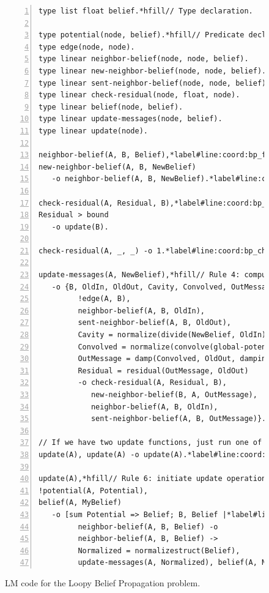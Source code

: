 \begin{figure}[ht]
\begin{Verbatim}[numbers=left, fontsize=\codesize, commandchars=\*\#\&]
type list float belief.*hfill// Type declaration.

type potential(node, belief).*hfill// Predicate declaration
type edge(node, node).
type linear neighbor-belief(node, node, belief).
type linear new-neighbor-belief(node, node, belief).
type linear sent-neighbor-belief(node, node, belief).
type linear check-residual(node, float, node).
type linear belief(node, belief).
type linear update-messages(node, belief).
type linear update(node).

neighbor-belief(A, B, Belief),*label#line:coord:bp_first1&*hfill// Rule 1: update neighbor belief value
new-neighbor-belief(A, B, NewBelief)
   -o neighbor-belief(A, B, NewBelief).*label#line:coord:bp_first2&

check-residual(A, Residual, B),*label#line:coord:bp_check1&*hfill// Rule 2: check residual
Residual > bound
   -o update(B).

check-residual(A, _, _) -o 1.*label#line:coord:bp_check2&*hfill// Rule 3: check residual

update-messages(A, NewBelief),*hfill// Rule 4: compute belief to be sent to a neighbor node*label#line:coord:bp_iterate1&
   -o {B, OldIn, OldOut, Cavity, Convolved, OutMessage, Residual |
         !edge(A, B),
         neighbor-belief(A, B, OldIn),
         sent-neighbor-belief(A, B, OldOut),
         Cavity = normalize(divide(NewBelief, OldIn)),
         Convolved = normalize(convolve(global-potential, Cavity)),
         OutMessage = damp(Convolved, OldOut, damping)
         Residual = residual(OutMessage, OldOut)
         -o check-residual(A, Residual, B),
            new-neighbor-belief(B, A, OutMessage),
            neighbor-belief(A, B, OldIn),
            sent-neighbor-belief(A, B, OutMessage)}.*label#line:coord:bp_iterate2&

// If we have two update functions, just run one of them*label#line:coord:bp_last1&
update(A), update(A) -o update(A).*label#line:coord:bp_update&*hfill// Rule 5: prune update operations

update(A),*hfill// Rule 6: initiate update operation*label#line:coord:bp_update1&
!potential(A, Potential),
belief(A, MyBelief)
   -o [sum Potential => Belief; B, Belief |*label#line:coord:bp_agg1&
         neighbor-belief(A, B, Belief) -o
         neighbor-belief(A, B, Belief) ->
         Normalized = normalizestruct(Belief),
         update-messages(A, Normalized), belief(A, Normalized)].*label#line:coord:bp_last2&*label#line:coord:bp_update2&*label#line:coord:bp_agg2&
\end{Verbatim}
\caption{LM code for the Loopy Belief Propagation problem.}
\label{code:coordination:bp}
\end{figure}


